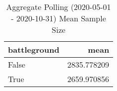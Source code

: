 \begin{table}
\centering
\caption{Aggregate Polling (2020-05-01 - 2020-10-31) Mean Sample Size}
\label{table:aggregate\_polling\_2020-05-01\_-\_2020-10-31\_mean\_sample\_size}
\begin{tabular}{lr}
\toprule
 battleground &         mean \\
\midrule
        False &  2835.778209 \\
         True &  2659.970856 \\
\bottomrule
\end{tabular}
\end{table}
